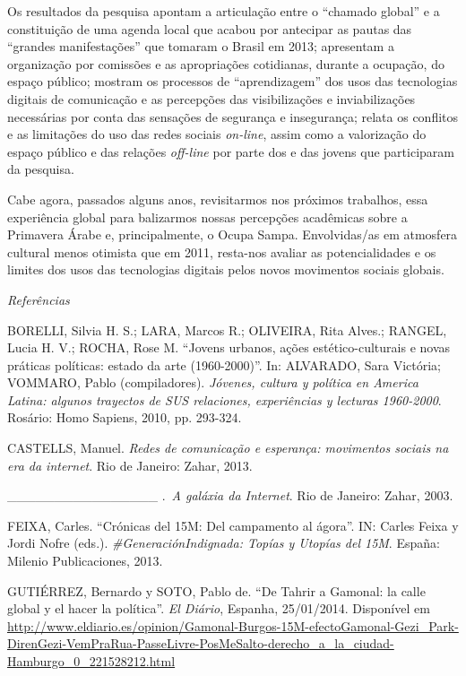 Os resultados da pesquisa apontam a articulação entre o ``chamado
global'' e a constituição de uma agenda local que acabou por antecipar
as pautas das ``grandes manifestações'' que tomaram o Brasil em 2013;
apresentam a organização por comissões e as apropriações cotidianas,
durante a ocupação, do espaço público; mostram os processos de
``aprendizagem'' dos usos das tecnologias digitais de comunicação e as
percepções das visibilizações e inviabilizações necessárias por conta
das sensações de segurança e insegurança; relata os conflitos e as
limitações do uso das redes sociais \emph{on-line}, assim como a
valorização do espaço público e das relações \emph{off-line} por parte
dos e das jovens que participaram da pesquisa.

Cabe agora, passados alguns anos, revisitarmos nos próximos trabalhos,
essa experiência global para balizarmos nossas percepções acadêmicas
sobre a Primavera Árabe e, principalmente, o Ocupa Sampa. Envolvidas/as
em atmosfera cultural menos otimista que em 2011, resta-nos avaliar as
potencialidades e os limites dos usos das tecnologias digitais pelos
novos movimentos sociais globais.

\emph{Referências}

BORELLI, Silvia H. S.; LARA, Marcos R.; OLIVEIRA, Rita Alves.; RANGEL,
Lucia H. V.; ROCHA, Rose M. ``Jovens urbanos, ações estético-culturais e
novas práticas políticas: estado da arte (1960-2000)''. In: ALVARADO,
Sara Victória; VOMMARO, Pablo (compiladores). \emph{Jóvenes, cultura y
política en America Latina: algunos trayectos de SUS relaciones,
experiências y lecturas 1960-2000}. Rosário: Homo Sapiens, 2010, pp.
293-324.

CASTELLS, Manuel. \emph{Redes de comunicação e esperança: movimentos
sociais na era da internet}. Rio de Janeiro: Zahar, 2013.

\_\_\_\_\_\_\_\_\_\_\_\_\_\_\_\_ .~\emph{A galáxia da Internet}. Rio de
Janeiro: Zahar, 2003.

FEIXA, Carles. ``Crónicas del 15M: Del campamento al ágora''. IN: Carles
Feixa y Jordi Nofre (eds.). \emph{\#GeneraciónIndignada: Topías y
Utopías del 15M}. España: Milenio Publicaciones, 2013.

GUTIÉRREZ, Bernardo y SOTO, Pablo de. ``De Tahrir a Gamonal: la calle
global y el hacer la política''. \emph{El Diário}, Espanha, 25/01/2014.
Disponível em
\url{http://www.eldiario.es/opinion/Gamonal-Burgos-15M-efectoGamonal-Gezi_Park-DirenGezi-VemPraRua-PasseLivre-PosMeSalto-derecho_a_la_ciudad-Hamburgo_0_221528212.html}

